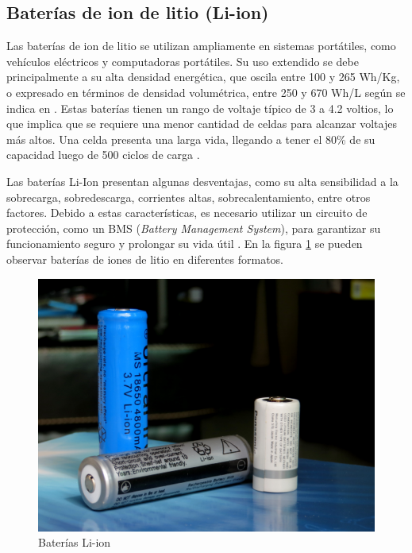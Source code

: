 \subsection*{Baterías de ion de litio (Li-ion)}

Las baterías de ion de litio se utilizan ampliamente en sistemas portátiles,
 como vehículos eléctricos y computadoras portátiles. Su uso extendido se 
 debe principalmente a su alta densidad energética, que oscila entre 100 y 265 Wh/Kg,
  o expresado en términos de densidad volumétrica, entre 250 y 670 Wh/L según se indica en 
  \cite{noauthor_lithium-ion_nodate}. Estas baterías tienen un rango de voltaje típico de
   3 a 4.2 voltios, lo que implica que se requiere una menor cantidad de celdas para
alcanzar voltajes más altos. Una celda presenta una larga vida, llegando a tener el 80\%
de su capacidad luego de 500 ciclos de carga \cite{texas_instrumens_multi-chemistry_2022}.

Las baterías Li-Ion presentan algunas desventajas, como su alta sensibilidad a la sobrecarga,
sobredescarga, corrientes altas, sobrecalentamiento, entre otros factores. Debido a estas características,
es necesario utilizar un circuito de protección, como un BMS (\textit{Battery Management System}), para garantizar
su funcionamiento seguro y prolongar su vida útil \cite{texas_instrumens_multi-chemistry_2022}. En la figura 
\ref{fig:liion} se pueden observar baterías de iones de litio en diferentes formatos.

\begin{figure}[H]
   \centering
   \includegraphics[scale=0.1]{imagenes/Li-ion.jpg}
   \caption{Baterías Li-ion \cite{mk2010_english_2012} }
   \label{fig:liion}
\end{figure}


